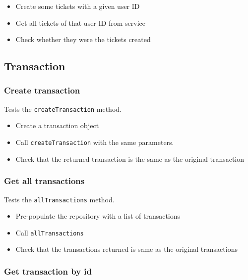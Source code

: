 \documentclass[]{article}
\providecommand{\tightlist}{%
  \setlength{\itemsep}{0pt}\setlength{\parskip}{0pt}}
\begin{document}
\begin{itemize}
\tightlist
\item
  Create some tickets with a given user ID
\item
  Get all tickets of that user ID from service
\item
  Check whether they were the tickets created
\end{itemize}

\hypertarget{transaction}{%
\subsection{Transaction}\label{transaction}}

\hypertarget{create-transaction}{%
\subsubsection{Create transaction}\label{create-transaction}}

Tests the \texttt{createTransaction} method.

\begin{itemize}
\tightlist
\item
  Create a transaction object
\item
  Call \texttt{createTransaction} with the same parameters.
\item
  Check that the returned transaction is the same as the original
  transaction
\end{itemize}

\hypertarget{get-all-transactions}{%
\subsubsection{Get all transactions}\label{get-all-transactions}}

Tests the \texttt{allTransactions} method.

\begin{itemize}
\tightlist
\item
  Pre-populate the repository with a list of transactions
\item
  Call \texttt{allTransactions}
\item
  Check that the transactions returned is same as the original
  transactions
\end{itemize}

\hypertarget{get-transaction-by-id}{%
\subsubsection{Get transaction by id}\label{get-transaction-by-id}}
\end{document}
